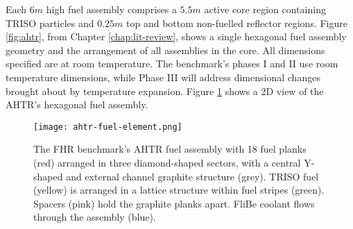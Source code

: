 Each $6m$ high fuel assembly comprises a $5.5m$ active core region containing
\gls{TRISO} particles and $0.25m$ top and bottom non-fuelled reflector regions.
Figure \ref{fig:ahtr}, from Chapter \ref{chap:lit-review}, shows a single 
hexagonal fuel assembly geometry and the arrangement of all assemblies in the core.
All dimensions specified are at room temperature. 
The benchmark's phases I and II use room temperature dimensions, while Phase III 
will address dimensional changes brought about by temperature expansion. 
Figure \ref{fig:ahtr-fuel-assembly} shows a 2D view of the 
\gls{AHTR}'s hexagonal fuel assembly. 
\begin{figure}[htbp]
    \centering
    \texttt{[image: ahtr-fuel-element.png]} 
            \hspace{0.5cm}
    \caption{The \acrfull{FHR} benchmark's \acrfull{AHTR} fuel assembly with 18 fuel 
    planks (red) arranged in three diamond-shaped sectors, with a central Y-shaped and 
    external channel graphite structure (grey). 
    TRISO fuel (yellow) is arranged in a lattice structure within fuel stripes (green). 
    Spacers (pink) hold the graphite planks apart. 
    FliBe coolant flows through the assembly (blue). }
    \label{fig:ahtr-fuel-assembly}
\end{figure}
